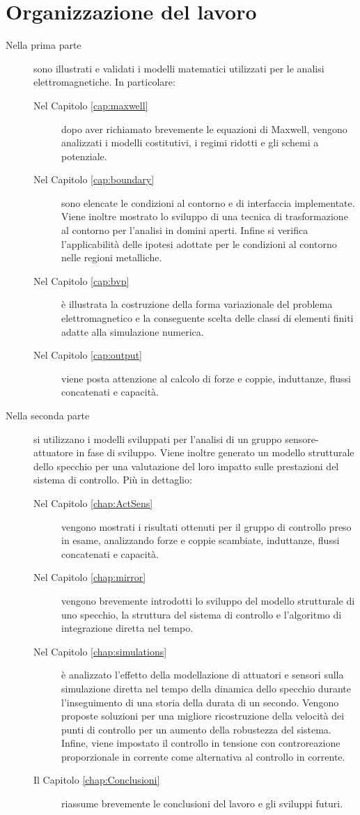 \section{Organizzazione del lavoro}


\begin{description}
\item[Nella prima parte] sono illustrati e validati i modelli matematici utilizzati per le analisi elettromagnetiche. In particolare:
  \begin{description}
  \item[Nel Capitolo \ref{cap:maxwell}] dopo aver richiamato brevemente le equazioni di Maxwell, vengono analizzati i modelli costitutivi, i regimi ridotti e gli schemi a potenziale.
  \item[Nel Capitolo \ref{cap:boundary}] sono elencate le condizioni al contorno e di interfaccia implementate. Viene inoltre mostrato lo sviluppo di una tecnica di trasformazione al contorno per l'analisi in domini aperti. Infine si verifica l'applicabilità delle ipotesi adottate per le condizioni al contorno nelle regioni metalliche. 
  \item[Nel Capitolo \ref{cap:bvp}] è illustrata la costruzione della forma variazionale del problema elettromagnetico e la conseguente scelta delle classi di elementi finiti adatte alla simulazione numerica.
  \item[Nel Capitolo \ref{cap:output}] viene posta attenzione al calcolo di forze e coppie, induttanze, flussi concatenati e capacità.
  \end{description}
\item[Nella seconda parte] si utilizzano i modelli sviluppati per l'analisi di un gruppo sensore-attuatore in fase di sviluppo. Viene inoltre generato un modello strutturale dello specchio per una valutazione del loro impatto sulle prestazioni del sistema di controllo. Più in dettaglio:
  \begin{description}
  \item[Nel Capitolo \ref{chap:ActSens}] vengono mostrati i risultati ottenuti per il gruppo di controllo preso in esame, analizzando forze e coppie scambiate, induttanze, flussi concatenati e capacità. 
  \item[Nel Capitolo \ref{chap:mirror}] vengono brevemente introdotti lo sviluppo del modello strutturale di uno specchio, la struttura del sistema di controllo e l'algoritmo di integrazione diretta nel tempo.
  \item[Nel Capitolo \ref{chap:simulations}] è analizzato l'effetto della modellazione di attuatori e sensori sulla simulazione diretta nel tempo della dinamica dello specchio durante l'inseguimento di una storia della durata di un secondo. Vengono proposte soluzioni per una migliore ricostruzione della velocità dei punti di controllo per un aumento della robustezza del sistema. Infine, viene impostato il controllo in tensione con controreazione proporzionale in corrente come alternativa al controllo in corrente.
  \item[Il Capitolo \ref{chap:Conclusioni}] riassume brevemente le conclusioni del lavoro e gli sviluppi futuri.
  \end{description}
\end{description}



